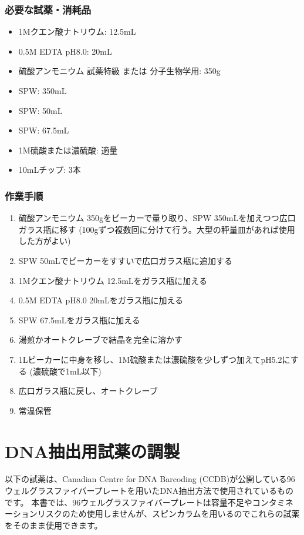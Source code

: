 \documentclass[titlepage,10pt,a4paper,uplatex]{jsbook}
\begin{document}
\subsubsection{必要な試薬・消耗品}
\begin{itemize}
\item 1Mクエン酸ナトリウム: 12.5mL
\item 0.5M EDTA pH8.0: 20mL
\item 硫酸アンモニウム 試薬特級 または 分子生物学用: 350g
\item SPW: 350mL
\item SPW: 50mL
\item SPW: 67.5mL
\item 1M硫酸または濃硫酸: 適量
\item 10mLチップ: 3本
\end{itemize}

\subsubsection{作業手順}
\begin{enumerate}
\item 硫酸アンモニウム 350gをビーカーで量り取り、SPW 350mLを加えつつ広口ガラス瓶に移す (100gずつ複数回に分けて行う。大型の秤量皿があれば使用した方がよい)
\item SPW 50mLでビーカーをすすいで広口ガラス瓶に追加する
\item 1Mクエン酸ナトリウム 12.5mLをガラス瓶に加える
\item 0.5M EDTA pH8.0 20mLをガラス瓶に加える
\item SPW 67.5mLをガラス瓶に加える
\item 湯煎かオートクレーブで結晶を完全に溶かす
\item 1Lビーカーに中身を移し、1M硫酸または濃硫酸を少しずつ加えてpH5.2にする (濃硫酸で1mL以下)
\item 広口ガラス瓶に戻し、オートクレーブ
\item 常温保管
\end{enumerate}

\section{DNA抽出用試薬の調製}\label{makingDNAextractionbuffers}

以下の試薬は、Canadian Centre for DNA Barcoding (CCDB)が公開している96ウェルグラスファイバープレートを用いたDNA抽出方法\citep{Ivanova2006}で使用されているものです。
本書では、96ウェルグラスファイバープレートは容量不足やコンタミネーションリスクのため使用しませんが、スピンカラムを用いるのでこれらの試薬をそのまま使用できます。
\end{document}
